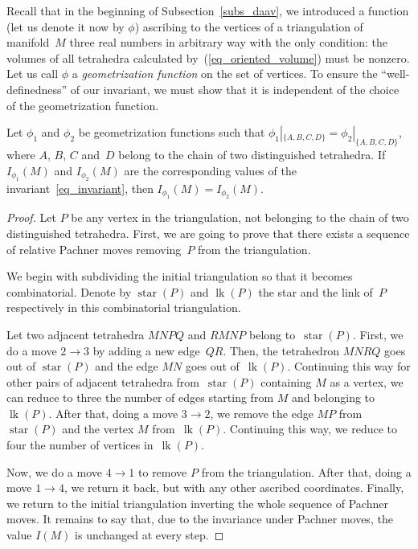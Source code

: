 \documentclass[pdftex]{sigma}
\DeclareMathOperator{\lk}{lk}
\DeclareMathOperator{\St}{star}
\begin{document}
Recall that in the beginning of Subsection~\ref{subs_daav}, we introduced a function (let us denote it now by $\phi$) ascribing to the vertices of a triangulation of manifold~$M$ three real numbers in arbitrary way with the only condition: the volumes of all tetrahedra calculated by~(\ref{eq_oriented_volume}) must be nonzero. Let us call $\phi$ a \emph{geometrization function} on the set of vertices. To ensure the ``well-def\/inedness'' of our invariant, we must show that it is independent of the choice of the geometrization function.
\begin{theorem}
Let $\phi_1$ and $\phi_2$ be geometrization functions such that $\phi_1|_{\{A, B, C, D\}} = \phi_2|_{\{A, B, C, D\}}$, where $A$, $B$, $C$ and~$D$ belong to the chain of two distinguished tetrahedra. If $I_{\phi_1}(M)$ and $I_{\phi_2}(M)$ are the corresponding values of the invariant~\eqref{eq_invariant}, then $I_{\phi_1}(M) = I_{\phi_2}(M)$.
\end{theorem}

\begin{proof}
Let $P$ be any vertex in the triangulation, not belonging to the chain of two distinguished tetrahedra. First, we are going to prove that there exists a sequence of relative Pachner moves removing~$P$ from the triangulation.

We begin with subdividing the initial triangulation so that it becomes combinatorial. Denote by $\St(P)$ and $\lk(P)$ the star and the link of~$P$ respectively in this combinatorial triangulation.

Let two adjacent tetrahedra $MNPQ$ and $RMNP$ belong to~$\St(P)$. First, we do a move $2 \to 3$ by adding a new edge~$QR$. Then, the tetrahedron $MNRQ$ goes out of $\St(P)$ and the edge $MN$ goes out of~$\lk(P)$. Continuing this way for other pairs of adjacent tetrahedra from~$\St(P)$ containing $M$ as a vertex, we can reduce to three the number of edges starting from $M$ and belonging to~$\lk(P)$. After that, doing a move $3 \to 2$, we remove the edge $MP$ from $\St(P)$ and the vertex $M$ from~$\lk(P)$. Continuing this way, we reduce to four the number of vertices in~$\lk(P)$.

Now, we do a move $4 \to 1$ to remove $P$ from the triangulation. After that, doing a move $1 \to 4$, we return it back, but with any other ascribed coordinates. Finally, we return to the initial triangulation inverting the whole sequence of Pachner moves. It remains to say that, due to the invariance under Pachner moves, the value $I(M)$ is unchanged at every step.
\end{proof}
\end{document}
